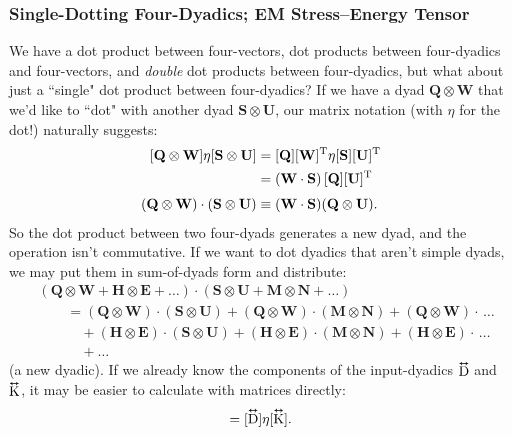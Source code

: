 \documentclass[12pt]{article}
\renewcommand{\vv}[1]{\mathbf{#1}}
\newcommand{\tightoverset}[2]{%
  \mathop{#2}\limits^{\vbox to -.5ex{\kern-0.75ex\hbox{$#1$}\vss}}}
\newcommand{\inlinedy}[1]{\tightoverset{\text{\tiny$\bm\leftrightarrow$}}{#1}}
\newcommand{\capdy}[1]{ \overset{ \text{\tiny$\bm\leftrightarrow$} }{\vphantom{\text{\small{A}}}\smash{#1}} }
\begin{document}
\subsubsection{Single-Dotting Four-Dyadics; EM Stress--Energy Tensor}

We have a dot product between four-vectors, dot products between four-dyadics and four-vectors, and \emph{double} dot products between four-dyadics, but what about just a ``single" dot product between four-dyadics? If we have a dyad $\vv Q \otimes \vv W$ that we'd like to ``dot" with another dyad $\vv S \otimes \vv U$, our matrix notation (with $\eta$ for the dot!) naturally suggests:
\begin{equation*}
\begin{aligned}
\mkern0mu [ \vv Q \otimes \vv W ] \eta [ \vv S \otimes \vv U ] &= [\vv Q][\vv W]^{\mathrm{T}} \eta [\vv S][\vv U]^{\mathrm{T}} \\
&= (\vv W \cdot \vv S) \, [\vv Q] [\vv U]^{\mathrm{T}} \\[3pt]
(\vv Q \otimes \vv W) \cdot (\vv S \otimes \vv U) & \equiv (\vv W \cdot \vv S) (\vv Q \otimes \vv U) .
\end{aligned}
\end{equation*}
So the dot product between two four-dyads generates a new dyad, and the operation isn't commutative. If we want to dot dyadics that aren't simple dyads, we may put them in sum-of-dyads form and distribute:
\begin{equation*}
\begin{aligned}
&(\vv Q \otimes \vv W + \vv H \otimes \vv E + \dots ) \cdot (\vv S \otimes \vv U + \vv M \otimes \vv N + \dots ) \\[3pt]
&\qquad = (\vv Q \otimes \vv W) \cdot (\vv S \otimes \vv U) + (\vv Q \otimes \vv W) \cdot (\vv M \otimes \vv N) + (\vv Q \otimes \vv W) \cdot \, \dots \\
& \qquad \quad + (\vv H \otimes \vv E) \cdot (\vv S \otimes \vv U) + (\vv H \otimes \vv E) \cdot (\vv M \otimes \vv N) + (\vv H \otimes \vv E) \cdot \, \dots \\
& \qquad \quad + \dots
\end{aligned}
\end{equation*}
(a new dyadic). If we already know the components of the input-dyadics $\inlinedy{\mathrm{D}}$ and $\inlinedy{\mathrm{K}}$, it may be easier to calculate with matrices directly:
\begin{equation*}
[\capdy{\mathrm{D}} \cdot \capdy{\mathrm{K}}] = [\capdy{\mathrm{D}}] \eta [\capdy{\mathrm{K}}] .
\end{equation*}
\end{document}
